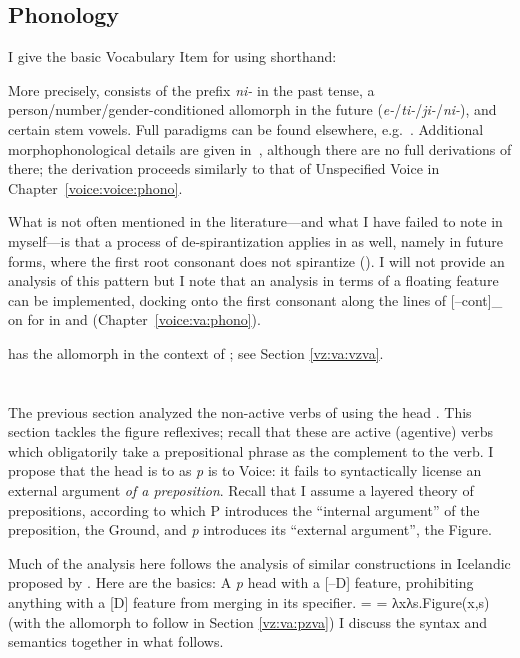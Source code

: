 	
	\subsection{Phonology} \label{vz:vz:phono}
I give the basic Vocabulary Item for {\vz} using shorthand:
\ex {\vz} \lra~{\tnif}
\xe

More precisely, {\vz} consists of the prefix \emph{ni-} in the past tense, a person/number/gender-conditioned allomorph in the future (\emph{e-}/\emph{ti-}/\emph{ji-}/\emph{ni-}), and certain stem vowels. Full paradigms can be found elsewhere, e.g.~\cite{schwarzwald08}. Additional morphophonological details are given in~\cite{kastner18nllt}, although there are no full derivations of {\tnif} there; the derivation proceeds similarly to that of Unspecified Voice in Chapter~\ref{voice:voice:phono}.

What is not often mentioned in the literature---and what I have failed to note in \cite{kastner18nllt} myself---is that a process of de-spirantization applies in {\tnif} as well, namely in future forms, where the first root consonant does not spirantize (). I will not provide an analysis of this pattern but I note that an analysis in terms of a floating feature can be implemented, docking onto the first consonant along the lines of [--cont]_{} on  for {\va} in {\tpie} and {\thit} (Chapter~\ref{voice:va:phono}).

{\vz} has the allomorph {\thit} in the context of {\va}; see Section \ref{vz:va:vzva}.


\section{\pz} \label{vz:pz}
The previous section analyzed the non-active verbs of {\tnif} using the head {\vz}. This section tackles the figure reflexives; recall that these are active (agentive) verbs which obligatorily take a prepositional phrase as the complement to the verb. I propose that the head {\pz} is to {\vz} as \textit{p} is to Voice: it fails to syntactically license an external argument \emph{of a preposition}. Recall that I assume a layered theory of prepositions, according to which P introduces the ``internal argument'' of the preposition, the Ground, and \textit{p} introduces its ``external argument'', the Figure.

Much of the analysis here follows the analysis of similar constructions in Icelandic proposed by \cite{wood15springer}. Here are the basics:
\pex \textbf{\pz}
	\a A \textit{p} head with a [--D] feature, prohibiting anything with a [D] feature from merging in its specifier.
    \a \denote{\pz} =  = λxλs.Figure(x,s)
	\a {\pz} {\lra} {\tnif} \hfill (with the allomorph {\thit} to follow in Section \ref{vz:va:pzva})
\xe
I discuss the syntax and semantics together in what follows.

